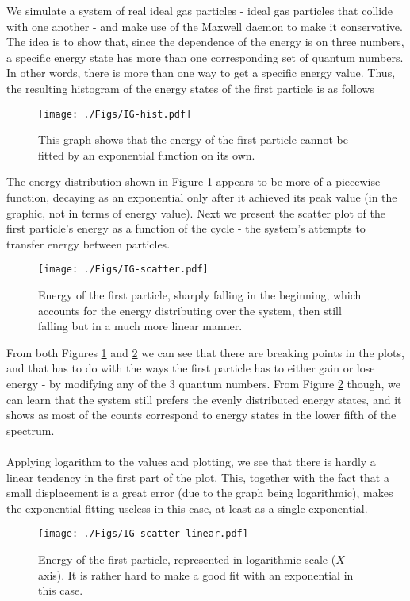 \documentclass[a4paper, 12pt, notitlepage]{article}
\begin{document}
We simulate a system of real ideal gas particles - ideal gas particles that collide with one another - and make use of the Maxwell daemon to make it conservative. The idea is to show that, since the dependence of the energy is on three numbers, a specific energy state has more than one corresponding set of quantum numbers. In other words, there is more than one way to get a specific energy value. Thus, the resulting histogram of the energy states of the first particle is as follows
\begin{figure}[h]
	\centering
	\texttt{[image: ./Figs/IG-hist.pdf]}
	\caption{This graph shows that the energy of the first particle cannot be fitted by an exponential function on its own.}\label{fig:fig6}
\end{figure}

\noindent
The energy distribution shown in Figure \ref{fig:fig6} appears to be more of a piecewise function, decaying as an exponential only after it achieved its peak value (in the graphic, not in terms of energy value). Next we present the scatter plot of the first particle's energy as a function of the cycle - the system's attempts to transfer energy between particles.
\begin{figure}[!h]
	\centering
	\texttt{[image: ./Figs/IG-scatter.pdf]}
	\caption{Energy of the first particle, sharply falling in the beginning, which accounts for the energy distributing over the system, then still falling but in a much more linear manner.}\label{fig:fig7}
\end{figure}

\noindent
From both Figures \ref{fig:fig6} and \ref{fig:fig7} we can see that there are breaking points in the plots, and that has to do with the ways the first particle has to either gain or lose energy - by modifying any of the 3 quantum numbers. From Figure \ref{fig:fig7} though, we can learn that the system still prefers the evenly distributed energy states, and it shows as most of the counts correspond to energy states in the lower fifth of the spectrum.\\\\
Applying logarithm to the values and plotting, we see that there is hardly a linear tendency in the first part of the plot. This, together with the fact that a small displacement is a great error (due to the graph being logarithmic), makes the exponential fitting useless in this case, at least as a single exponential.
\begin{figure}[!h]
	\centering
	\texttt{[image: ./Figs/IG-scatter-linear.pdf]}
	\caption{Energy of the first particle, represented in logarithmic scale ($X$ axis). It is rather hard to make a good fit with an exponential in this case.}\label{fig:fig8}
\end{figure}
\end{document}
